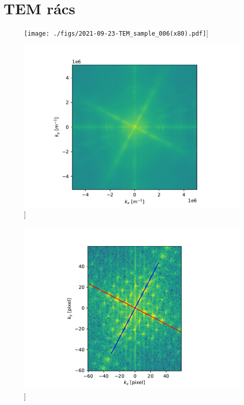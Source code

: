 \documentclass[pdftex,12pt,a4paper]{article}
\begin{document}
	\section{TEM rács}
		\begin{figure}[H]
			\centering
			\texttt{[image: ./figs/2021-09-23-TEM\_sample\_006(x80).pdf]}]
			\caption{}
			\label{temgrid}
		\end{figure}
		\begin{figure}[H]
			\centering
			\includegraphics[scale=1]{./figs/2dfft.pdf}]
			\caption{}
			\label{2dfft}
		\end{figure}
		\begin{figure}[H]
			\centering
			\includegraphics[scale=1]{./figs/fftlines.pdf}]
			\caption{}
			\label{fftlines}
		\end{figure}
\end{document}
